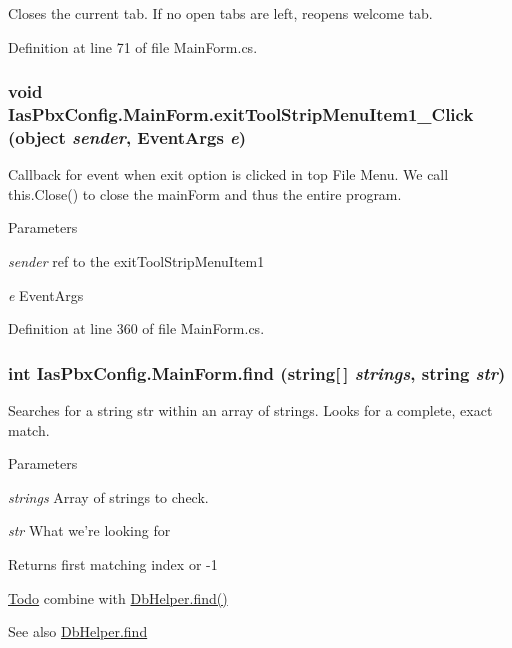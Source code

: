Closes the current tab. If no open tabs are left, reopens welcome tab. 

Definition at line 71 of file MainForm.cs.\hypertarget{class_ias_pbx_config_1_1_main_form_aef7b05da6bcc8fe3038122275b665ccf}{
\subsubsection[{exitToolStripMenuItem1\_\-Click}]{\setlength{\rightskip}{0pt plus 5cm}void IasPbxConfig.MainForm.exitToolStripMenuItem1\_\-Click (object {\em sender}, \/  EventArgs {\em e})}}
\label{class_ias_pbx_config_1_1_main_form_aef7b05da6bcc8fe3038122275b665ccf}


Callback for event when exit option is clicked in top File Menu. We call this.Close() to close the mainForm and thus the entire program. 
\begin{DoxyParams}{Parameters}
\item[{\em sender}]ref to the exitToolStripMenuItem1 \item[{\em e}]EventArgs \end{DoxyParams}


Definition at line 360 of file MainForm.cs.\hypertarget{class_ias_pbx_config_1_1_main_form_a2a8635cccbee2889edeca0ad76095e34}{
\subsubsection[{find}]{\setlength{\rightskip}{0pt plus 5cm}int IasPbxConfig.MainForm.find (string\mbox{[}$\,$\mbox{]} {\em strings}, \/  string {\em str})}}
\label{class_ias_pbx_config_1_1_main_form_a2a8635cccbee2889edeca0ad76095e34}


Searches for a string str within an array of strings. Looks for a complete, exact match. 
\begin{DoxyParams}{Parameters}
\item[{\em strings}]Array of strings to check. \item[{\em str}]What we're looking for \end{DoxyParams}
\begin{DoxyReturn}{Returns}
first matching index or -\/1
\end{DoxyReturn}
\begin{Desc}
\item[\hyperlink{todo__todo000038}{Todo}]combine with \hyperlink{class_ias_pbx_config_1_1_db_helper_a92c16852946e46462fe8bb9923ce374c}{DbHelper.find()} \end{Desc}
\begin{DoxySeeAlso}{See also}
\hyperlink{class_ias_pbx_config_1_1_db_helper_a92c16852946e46462fe8bb9923ce374c}{DbHelper.find} 
\end{DoxySeeAlso}


